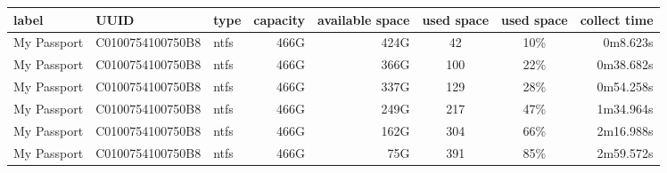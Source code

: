 \documentclass[12pt]{article}
\begin{document}
\begin{center}
  \tiny
    \begin{tabular}{|l|l|l|r|r|c|c|r|}
    \hline
    \textbf{label} & \textbf{UUID}    & \textbf{type} & \multicolumn{1}{l|}{\textbf{capacity}} & \multicolumn{1}{l|}{\textbf{available space}} & \multicolumn{1}{l|}{\textbf{used space}} & \multicolumn{1}{l|}{\textbf{used space}} & \multicolumn{1}{l|}{\textbf{collect time}} \\ \hline
    My Passport    & C0100754100750B8 & ntfs          & 466G                                   & 424G                                          & 42                                       & 10\%                                     & 0m8.623s                                   \\ \hline
    My Passport    & C0100754100750B8 & ntfs          & 466G                                   & 366G                                          & 100                                      & 22\%                                     & 0m38.682s                                  \\ \hline
    My Passport    & C0100754100750B8 & ntfs          & 466G                                   & 337G                                          & 129                                      & 28\%                                     & 0m54.258s                                  \\ \hline
    My Passport    & C0100754100750B8 & ntfs          & 466G                                   & 249G                                          & 217                                      & 47\%                                     & 1m34.964s                                  \\ \hline
    My Passport    & C0100754100750B8 & ntfs          & 466G                                   & 162G                                          & 304                                      & 66\%                                     & 2m16.988s                                  \\ \hline
    My Passport    & C0100754100750B8 & ntfs          & 466G                                   & 75G                                           & 391                                      & 85\%                                     & 2m59.572s                                  \\ \hline
    \end{tabular}
  \label{tab:SaturationLatencyData}
\end{center}




\newpage


\end{document}

